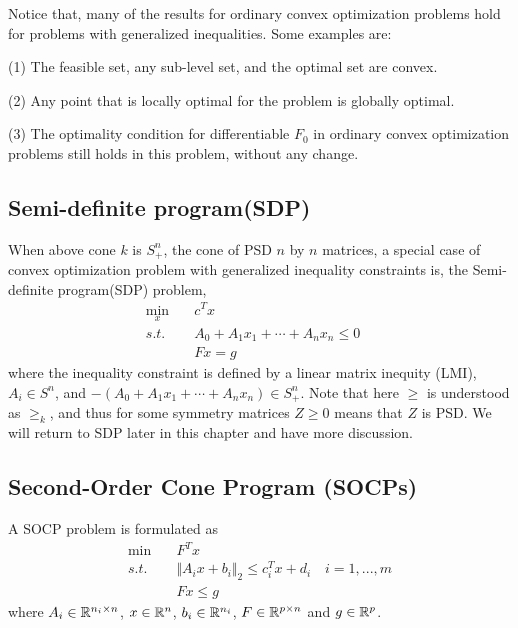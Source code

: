 Notice that, many of the results for ordinary convex optimization problems hold for problems with generalized inequalities. Some examples are:

(1) The feasible set, any sub-level set, and the optimal set are convex.

(2) Any point that is locally optimal for the problem is globally optimal.

(3) The optimality condition for differentiable $F_0$ in ordinary convex optimization problems still holds in this problem, without any change.


\vspace{0.3cm}
\subsection{Semi-definite program(SDP)}
When above cone $k$ is $S^n_+$, the cone of PSD $n$ by $n$ matrices, a special case of convex optimization problem with generalized inequality constraints is, the Semi-definite program(SDP) problem,
\begin{align*}
\min_x\quad & c^Tx \\
s.t.\quad & A_0+A_1x_1+\cdots+A_nx_n\leq 0\quad \\
& Fx = g
\end{align*}
where the inequality constraint is defined by a linear matrix inequity (LMI), $A_i\in S^n$, and $-(A_0+A_1x_1+\cdots+A_nx_n)\in S^n_+$. Note that here $\geq$ is understood as $\geq_k$, and thus for some symmetry matrices $Z\geq 0$ means that $Z$ is PSD. We will return to SDP later in this chapter and have more discussion.









\subsection{Second-Order Cone Program (SOCPs)}
A SOCP problem is formulated as
\begin{align*}
\min \quad&F^Tx\\
s.t. \quad& \Vert A_ix+b_i\Vert_2 \leq c_i^Tx + d_i\quad i = 1,...,m\\
&Fx \leq g
\end{align*}
where $A_i\in \mathbb{R}^{n_i\times n}$, $x\in \mathbb{R}^n$, $b_i\in \mathbb{R}^{n_i}$, $F\in \mathbb{R}^{p\times n}$ and $g\in \mathbb{R}^p$.

